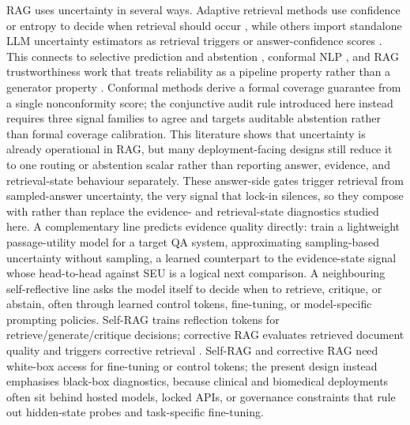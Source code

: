 RAG uses uncertainty in several ways.
Adaptive retrieval methods use confidence or entropy to decide when retrieval
should occur
\citep{jiang2023active,su2024dragin,yao2025seakr,liu2025ctrla,zubkova2025sugar},
while others import standalone LLM uncertainty estimators as retrieval triggers
or answer-confidence scores
\citep{moskvoretskii2025adaptive}.
This connects to selective prediction and abstention
\citep{geifman2017selective,tomani2024abstention}, conformal NLP
\citep{campos2024conformalnlp}, and RAG trustworthiness work that treats
reliability as a pipeline property rather than a generator property
\citep{sun2024trustllm,ni2025trustworthyrag}.
Conformal methods derive a formal coverage guarantee from a single
nonconformity score; the conjunctive audit rule introduced here instead
requires three signal families to agree and targets auditable abstention rather
than formal coverage calibration.
This literature shows that uncertainty is already operational in RAG,
but many deployment-facing designs still reduce it to one routing or
abstention scalar rather than reporting answer, evidence, and retrieval-state
behaviour separately.
These answer-side gates trigger retrieval from sampled-answer
uncertainty, the very signal that lock-in silences, so they compose with
rather than replace the evidence- and retrieval-state diagnostics studied here.
A complementary line predicts evidence quality directly:
\citet{perezbeltrachini2025passageutility} train a lightweight passage-utility
model for a target QA system, approximating sampling-based uncertainty without
sampling, a learned counterpart to the evidence-state signal whose
head-to-head against SEU is a logical next comparison.
A neighbouring self-reflective line asks the model itself to decide when to
retrieve, critique, or abstain, often through learned control tokens,
fine-tuning, or model-specific prompting policies.
Self-RAG trains reflection tokens for retrieve/generate/critique decisions;
corrective RAG evaluates retrieved document quality and triggers corrective
retrieval \citep{asai2024selfrag,yan2024crag}.
Self-RAG and corrective RAG need white-box access for fine-tuning or control
tokens; the present design instead emphasises black-box diagnostics, because
clinical and biomedical deployments often sit behind hosted models, locked
APIs, or governance constraints that rule out hidden-state probes and
task-specific fine-tuning.

